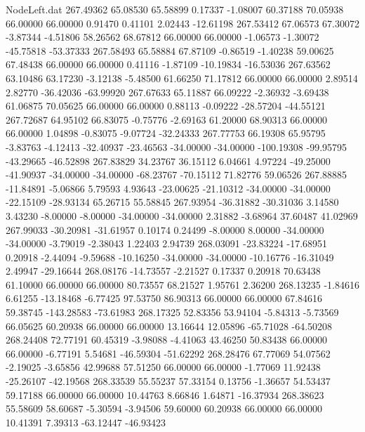 \begin{filecontents}{NodeLeft.dat}
 267.49362   65.08530   65.58899     0.17337   -1.08007   60.37188   70.05938   66.00000   66.00000    0.91470    0.41101    2.02443  -12.61198
 267.53412   67.06573   67.30072    -3.87344   -4.51806   58.26562   68.67812   66.00000   66.00000   -1.06573   -1.30072  -45.75818  -53.37333
 267.58493   65.58884   67.87109    -0.86519   -1.40238   59.00625   67.48438   66.00000   66.00000    0.41116   -1.87109  -10.19834  -16.53036
 267.63562   63.10486   63.17230    -3.12138   -5.48500   61.66250   71.17812   66.00000   66.00000    2.89514    2.82770  -36.42036  -63.99920
 267.67633   65.11887   66.09222    -2.36932   -3.69438   61.06875   70.05625   66.00000   66.00000    0.88113   -0.09222  -28.57204  -44.55121
 267.72687   64.95102   66.83075    -0.75776   -2.69163   61.20000   68.90313   66.00000   66.00000    1.04898   -0.83075   -9.07724  -32.24333
 267.77753   66.19308   65.95795    -3.83763   -4.12413  -32.40937  -23.46563  -34.00000  -34.00000 -100.19308  -99.95795  -43.29665  -46.52898
 267.83829   34.23767   36.15112     6.04661    4.97224  -49.25000  -41.90937  -34.00000  -34.00000  -68.23767  -70.15112   71.82776   59.06526
 267.88885  -11.84891   -5.06866     5.79593    4.93643  -23.00625  -21.10312  -34.00000  -34.00000  -22.15109  -28.93134   65.26715   55.58845
 267.93954  -36.31882  -30.31036     3.14580    3.43230   -8.00000   -8.00000  -34.00000  -34.00000    2.31882   -3.68964   37.60487   41.02969
 267.99033  -30.20981  -31.61957     0.10174    0.24499   -8.00000    8.00000  -34.00000  -34.00000   -3.79019   -2.38043    1.22403    2.94739
 268.03091  -23.83224  -17.68951     0.20918   -2.44094   -9.59688  -10.16250  -34.00000  -34.00000  -10.16776  -16.31049    2.49947  -29.16644
 268.08176  -14.73557   -2.21527     0.17337    0.20918   70.63438   61.10000   66.00000   66.00000   80.73557   68.21527    1.95761    2.36200
 268.13235   -1.84616    6.61255   -13.18468   -6.77425   97.53750   86.90313   66.00000   66.00000   67.84616   59.38745 -143.28583  -73.61983
 268.17325   52.83356   53.94104    -5.84313   -5.73569   66.05625   60.20938   66.00000   66.00000   13.16644   12.05896  -65.71028  -64.50208
 268.24408   72.77191   60.45319    -3.98088   -4.41063   43.46250   50.83438   66.00000   66.00000   -6.77191    5.54681  -46.59304  -51.62292
 268.28476   67.77069   54.07562    -2.19025   -3.65856   42.99688   57.51250   66.00000   66.00000   -1.77069   11.92438  -25.26107  -42.19568
 268.33539   55.55237   57.33154     0.13756   -1.36657   54.53437   59.17188   66.00000   66.00000   10.44763    8.66846    1.64871  -16.37934
 268.38623   55.58609   58.60687    -5.30594   -3.94506   59.60000   60.20938   66.00000   66.00000   10.41391    7.39313  -63.12447  -46.93423

\end{filecontents}
